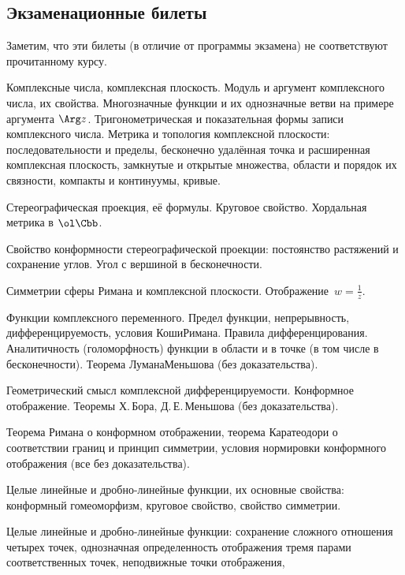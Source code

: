\documentclass[a4paper]{article}
\begin{document}
\subsection*{Экзаменационные билеты}

\centerline{\footnotesize Заметим, что эти билеты (в отличие от программы экзамена) не соответствуют прочитанному курсу.}

\medskip

\begin{nums}{-2}
\item Комплексные числа, комплексная плоскость. Модуль и аргумент комплексного числа,
      их свойства. Многозначные функции и их однозначные ветви на примере аргумента $\Arg z$.
      Тригонометрическая и показательная формы записи комплексного числа. Метрика и топология комплексной плоскости:
      последовательности и пределы, бесконечно удалённая точка и расширенная комплексная плоскость,
      замкнутые и открытые множества, области и порядок их связности, компакты и континуумы, кривые.
\item Стереографическая проекция, её формулы. Круговое свойство. Хордальная метрика в $\ol \Cbb$.
\item Свойство конформности стереографической проекции: постоянство растяжений и сохранение углов.
      Угол с вершиной в бесконечности.
\item Симметрии сферы Римана и комплексной плоскости. Отображение~${w = \frac1z}$.
\item Функции комплексного переменного. Предел функции, непрерывность, дифференцируемость, условия Коши\ч Римана.
      Правила дифференцирования. Аналитичность (голоморфность)
      функции в области и в точке (в том числе в бесконечности). Теорема Лумана\ч Меньшова (без доказательства).
\item Геометрический смысл комплексной дифференцируемости. Конформное отображение. Теоремы
      Х.\,Бора, Д.\,Е.\,Меньшова (без доказательства).
\item Теорема Римана о конформном отображении, теорема Каратеодори о соответствии границ и принцип симметрии,
      условия нормировки конформного отображения (все без доказательства).
\item Целые линейные и дробно-линейные функции, их основные свойства: конформный гомеоморфизм, круговое
      свойство, свойство симметрии.
\item Целые линейные и дробно-линейные функции: сохранение сложного отношения четырех точек, однозначная
      определенность отображения тремя  парами  соответственных точек, неподвижные точки отображения,

\end{nums}
\end{document}
